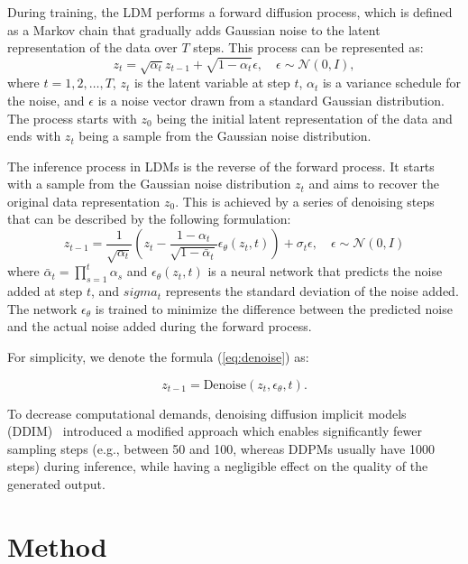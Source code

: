 During training, the LDM performs a forward diffusion process, which is defined as a Markov chain that gradually adds Gaussian noise to the latent representation of the data over \( T \) steps. This process can be represented as:
\begin{equation}
    z_{t} = \sqrt{\alpha_t} z_{t-1} + \sqrt{1 - \alpha_t} \epsilon, \quad \epsilon \sim \mathcal{N}(0, I),
\end{equation}
where \( t = 1, 2, \ldots, T \), \( z_t \) is the latent variable at step \( t \), \( \alpha_t \) is a variance schedule for the noise, and \( \epsilon \) is a noise vector drawn from a standard Gaussian distribution. The process starts with \( z_0 \) being the initial latent representation of the data and ends with \( z_t \) being a sample from the Gaussian noise distribution.

The inference process in LDMs is the reverse of the forward process. It starts with a sample from the Gaussian noise distribution \( z_t \) and aims to recover the original data representation \( z_0 \). This is achieved by a series of denoising steps that can be described by the following formulation:
\begin{equation}
    z_{t-1} = \frac{1}{\sqrt{\alpha_t}} \left( z_t - \frac{1 - \alpha_t}{\sqrt{1 - \bar{\alpha}_t}} \epsilon_\theta(z_t, t) \right) + \sigma_t\epsilon, \quad \epsilon \sim \mathcal{N}(0, I) 
    \label{eq:denoise}
\end{equation}
where \( \bar{\alpha}_t = \prod_{s=1}^{t} \alpha_s \) and \( \epsilon_\theta(z_t, t) \) is a neural network that predicts the noise added at step \( t \), and $sigma_t$ represents the standard deviation of the noise added. The network \( \epsilon_\theta \) is trained to minimize the difference between the predicted noise and the actual noise added during the forward process.

For simplicity, we denote the formula (\ref{eq:denoise}) as:

\begin{equation}
    z_{t-1} = \text{Denoise}(z_t, \epsilon_\theta, t).
\end{equation}

To decrease computational demands, denoising diffusion implicit models (DDIM)~\cite{ddim} introduced a modified approach which enables significantly fewer sampling steps (e.g., between 50 and 100, whereas DDPMs usually have 1000 steps) during inference, while having a negligible effect on the quality of the generated output.

\section{Method}

